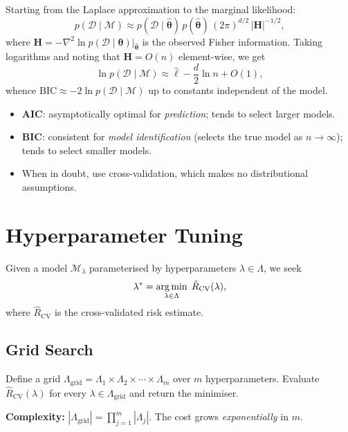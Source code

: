 \begin{proposition}
Starting from the Laplace approximation to the marginal likelihood:
\[
  p(\mathcal{D}\mid\mathcal{M}) \approx p(\mathcal{D}\mid\hat{\bm{\theta}})\,p(\hat{\bm{\theta}})\,(2\pi)^{d/2}\,|\bm{H}|^{-1/2},
\]
where $\bm{H}=-\nabla^2\ln p(\mathcal{D}\mid\bm{\theta})\big|_{\hat{\bm{\theta}}}$ is the observed Fisher information. Taking logarithms and noting that $\bm{H}=O(n)$ element-wise, we get
\[
  \ln p(\mathcal{D}\mid\mathcal{M}) \approx \hat\ell - \frac{d}{2}\ln n + O(1),
\]
whence $\text{BIC}\approx -2\ln p(\mathcal{D}\mid\mathcal{M})$ up to constants independent of the model.
\end{proposition}

\begin{bestpractice}[title=\textbf{AIC vs BIC in Practice}]
\begin{itemize}
  \item \textbf{AIC}: asymptotically optimal for \emph{prediction}; tends to select larger models.
  \item \textbf{BIC}: consistent for \emph{model identification} (selects the true model as $n\to\infty$); tends to select smaller models.
  \item When in doubt, use cross-validation, which makes no distributional assumptions.
\end{itemize}
\end{bestpractice}

\section{Hyperparameter Tuning}

\begin{definition}
Given a model $\mathcal{M}_\lambda$ parameterised by hyperparameters $\lambda\in\Lambda$, we seek
\[
  \lambda^* = \operatorname*{arg\,min}_{\lambda\in\Lambda}\; \hat{R}_{\text{CV}}(\lambda),
\]
where $\hat{R}_{\text{CV}}$ is the cross-validated risk estimate.
\end{definition}

\subsection{Grid Search}

\begin{algorithme}[title=\textbf{Grid Search}]
Define a grid $\Lambda_{\text{grid}}=\Lambda_1\times\Lambda_2\times\cdots\times\Lambda_m$ over $m$ hyperparameters. Evaluate $\hat{R}_{\text{CV}}(\lambda)$ for every $\lambda\in\Lambda_{\text{grid}}$ and return the minimiser.

\medskip
\textbf{Complexity:} $|\Lambda_{\text{grid}}|=\prod_{j=1}^m |\Lambda_j|$. The cost grows \emph{exponentially} in $m$.
\end{algorithme}


